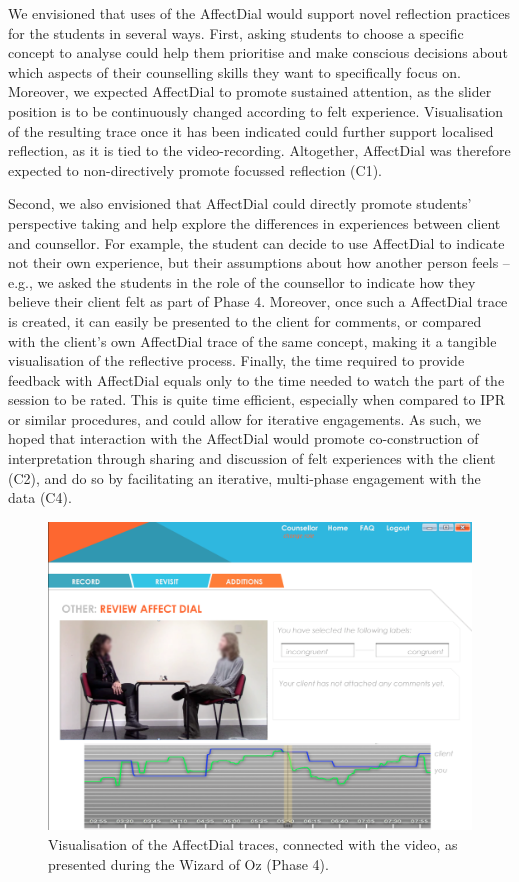 \documentclass{sigchi}
\begin{document}
We envisioned that uses of the AffectDial would support novel reflection practices for the students in several ways. First, asking students to choose a specific concept to analyse could help them prioritise and make conscious decisions about which aspects of their counselling skills they want to specifically focus on. Moreover, we expected AffectDial to promote sustained attention, as the slider position is to be continuously changed according to felt experience. Visualisation of the resulting trace once it has been indicated could further support localised reflection, as it is tied to the video-recording. Altogether, AffectDial was therefore expected to non-directively promote focussed reflection (C1). 

Second, we also envisioned that AffectDial could directly promote students' perspective taking and help explore the differences in experiences between client and counsellor. For example, the student can decide to use AffectDial to indicate not their own experience, but their assumptions about how another person feels -- e.g., we asked the students in the role of the counsellor to indicate how they believe their client felt as part of Phase 4. Moreover, once such a AffectDial trace is created, it can easily be presented to the client for comments, or compared with the client's own AffectDial trace of the same concept, making it a tangible visualisation of the reflective process. Finally, the time required to provide feedback with AffectDial equals only to the time needed to watch the part of the session to be rated. This is quite time efficient, especially when compared to IPR or similar procedures, and could allow for iterative engagements. As such, we hoped that interaction with the AffectDial would promote co-construction of interpretation through sharing and discussion of felt experiences with the client (C2), and do so by facilitating an iterative, multi-phase engagement with the data (C4).

\begin{figure}
  \centering
	\includegraphics[width=.95\columnwidth]{images/AffectDial.png}
	\caption{Visualisation of the AffectDial traces, connected with the video, as presented during the Wizard of Oz (Phase 4).}
	\label{fig:affectDial}
\end{figure}
\end{document}
